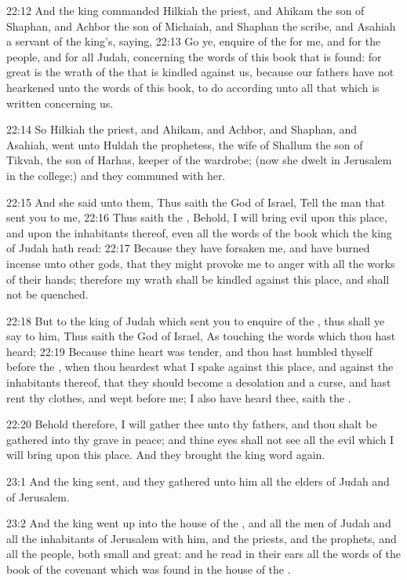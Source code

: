22:12 And the king commanded Hilkiah the priest, and Ahikam the son of
Shaphan, and Achbor the son of Michaiah, and Shaphan the scribe, and
Asahiah a servant of the king's, saying, 22:13 Go ye, enquire of the
\LORD for me, and for the people, and for all Judah, concerning the
words of this book that is found: for great is the wrath of the \LORD
that is kindled against us, because our fathers have not hearkened
unto the words of this book, to do according unto all that which is
written concerning us.

22:14 So Hilkiah the priest, and Ahikam, and Achbor, and Shaphan, and
Asahiah, went unto Huldah the prophetess, the wife of Shallum the son
of Tikvah, the son of Harhas, keeper of the wardrobe; (now she dwelt
in Jerusalem in the college;) and they communed with her.

22:15 And she said unto them, Thus saith the \LORD God of Israel, Tell
the man that sent you to me, 22:16 Thus saith the \LORD, Behold, I will
bring evil upon this place, and upon the inhabitants thereof, even all
the words of the book which the king of Judah hath read: 22:17 Because
they have forsaken me, and have burned incense unto other gods, that
they might provoke me to anger with all the works of their hands;
therefore my wrath shall be kindled against this place, and shall not
be quenched.

22:18 But to the king of Judah which sent you to enquire of the \LORD,
thus shall ye say to him, Thus saith the \LORD God of Israel, As
touching the words which thou hast heard; 22:19 Because thine heart
was tender, and thou hast humbled thyself before the \LORD, when thou
heardest what I spake against this place, and against the inhabitants
thereof, that they should become a desolation and a curse, and hast
rent thy clothes, and wept before me; I also have heard thee, saith
the \LORD.

22:20 Behold therefore, I will gather thee unto thy fathers, and thou
shalt be gathered into thy grave in peace; and thine eyes shall not
see all the evil which I will bring upon this place. And they brought
the king word again.

23:1 And the king sent, and they gathered unto him all the elders of
Judah and of Jerusalem.

23:2 And the king went up into the house of the \LORD, and all the men
of Judah and all the inhabitants of Jerusalem with him, and the
priests, and the prophets, and all the people, both small and great:
and he read in their ears all the words of the book of the covenant
which was found in the house of the \LORD.

